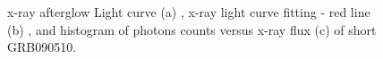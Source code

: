 \begin{figure}[hpbt]
\caption{x-ray  afterglow Light curve (a) , x-ray  light curve fitting - red line (b) , and histogram  of  photons counts  versus x-ray flux  (c)  of short GRB090510.}
\end{figure}
